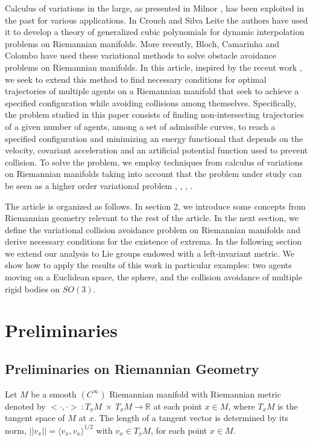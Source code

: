 \documentclass[letterpaper, 10 pt, conference]{ieeeconf}  %
\begin{document}
Calculus of variations in the large, as presented in Milnor \cite{Milnor}, has been exploited in the past for various applications. In Crouch and Silva Leite \cite{CroSil:91} the authors have used it to develop a theory of generalized cubic polynomials for dynamic interpolation problems on Riemannian manifolds. More recently, Bloch, Camarinha and Colombo \cite{BlCaCoCDC} have used these variational methods to solve obstacle avoidance problems on Riemannian manifolds. In this article, inspired by the recent work \cite{BlCaCoCDC}, we seek to extend this method to find necessary conditions for optimal trajectories of multiple agents on a Riemannian manifold that seek to achieve a specified configuration while avoiding collisions among themselves. Specifically, the problem studied in this paper consists of finding non-intersecting trajectories of a given number of agents, among a set of admissible curves, to reach a specified
configuration and minimizing an energy functional that depends on the velocity, covariant acceleration and an artificial potential function used to prevent collision. To solve the problem, we employ techniques from calculus of variations on Riemannian manifolds taking into account that the problem under study can be seen as a higher order variational problem \cite{blochcrouch2}, \cite{MargaridaThesis}, \cite{CMdD}, \cite{BlochHussein}.
 
The article is organized as follows. In section 2, we introduce some concepts from Riemannian geometry relevant to the rest of the article. In the next section, we define the variational collision avoidance problem on Riemannian manifolds and derive necessary conditions for the existence of extrema. In the following section we extend our analysis to Lie groups endowed with a left-invariant metric. We show how to apply the results of this work in particular examples: two agents moving on a Euclidean space, the sphere, and the collision avoidance of multiple rigid bodies on $SO(3)$.


\section{Preliminaries}
\subsection{Preliminaries on Riemannian Geometry}

Let $M$ be a smooth $ (C^\infty) $ Riemannian manifold with Riemannian metric denoted by $ <\cdot,\cdot>\ : T_{x}M \ \times \ T_{x}M \rightarrow \mathbb{R}$ at each point $x \in M $, where $T_{x}M$ is the tangent space of $M$ at $x$.  The length of a tangent vector is determined by its norm,
$||v_x||=\langle v_x,v_x\rangle^{1/2}$ with $v_x\in T_xM$, for each point $x\in M$.
\end{document}
